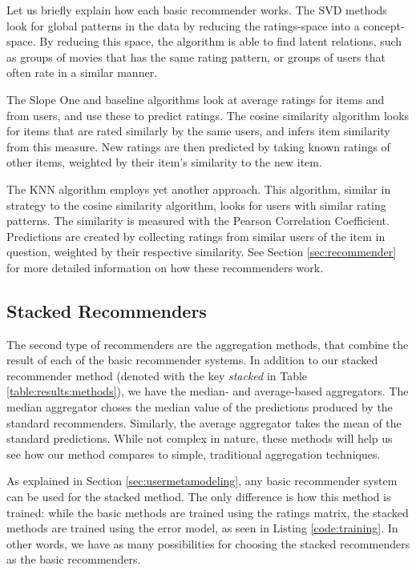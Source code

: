 Let us briefly explain how each basic recommender works.
The SVD methods look for global patterns in the data 
by reducing the ratings-space into a concept-space.
By reducing this space, the algorithm is able to find
latent relations, such as groups of movies that has the same
rating pattern, or groups of users that often rate in a similar manner.

The Slope One and baseline algorithms look at average
ratings for items and from users, and use these to predict ratings.
The cosine similarity algorithm looks for items that are rated
similarly by the same users, and infers item similarity from this measure.
New ratings are then predicted by taking known ratings of other items,
weighted by their item's similarity to the new item.

The KNN algorithm employs yet another approach. This algorithm,
similar in strategy to the cosine similarity algorithm,
looks for users with similar rating patterns.
The similarity is measured with the Pearson Correlation Coefficient.
Predictions are created by collecting ratings from similar users
of the item in question, weighted by their respective similarity.
See Section \ref{sec:recommender} for more 
detailed information on how these recommenders work. 

\subsection{Stacked Recommenders}

The second type of recommenders are the aggregation methods, 
that combine the result of each of the basic recommender systems.
In addition to our stacked recommender method
(denoted with the key \emph{stacked} in Table \ref{table:results:methods}),
we have the median- and average-based aggregators.
The median aggregator choses the median value of the predictions
produced by the standard recommenders.
Similarly, the average aggregator takes the mean of the
standard predictions.
While not complex in nature, these methods
will help us see how our method compares to simple, traditional
aggregation techniques.

As explained in Section \ref{sec:usermetamodeling},
any basic recommender system can be used for the stacked method.
The only difference is how this method is trained:
while the basic methods are trained using the ratings matrix,
the stacked methods are trained using the error model,
as seen in Listing \ref{code:training}.
In other words, we have as many possibilities for choosing
the stacked recommenders as the basic recommenders.

